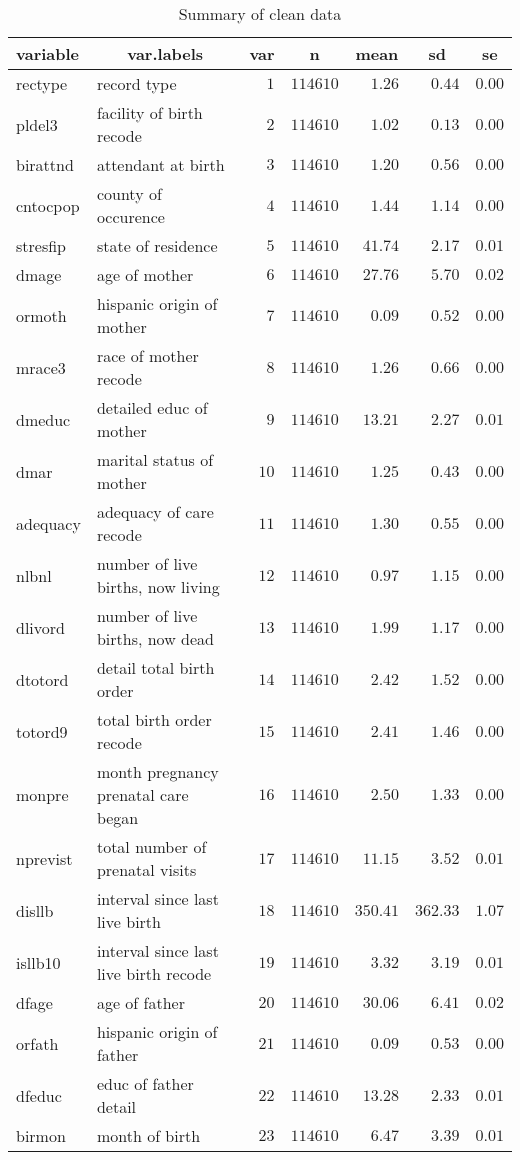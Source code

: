 %
\begin{table}[!tbp]
\footnotesize
\caption{Summary of clean data}
\label{tab:summaryClean} 
\begin{center}
\begin{tabular}{|l|l|r|r|r|r|r|}
\hline\hline
\multicolumn{1}{|l|}{variable}&\multicolumn{1}{c|}{var.labels}&\multicolumn{1}{c|}{var}&\multicolumn{1}{c|}{n}&\multicolumn{1}{c|}{mean}&\multicolumn{1}{c|}{sd}&\multicolumn{1}{c|}{se}\tabularnewline
\hline
rectype&record type&$ 1$&$114610$&$   1.26$&$  0.44$&$0.00$\tabularnewline
pldel3&facility of birth recode&$ 2$&$114610$&$   1.02$&$  0.13$&$0.00$\tabularnewline
birattnd&attendant at birth&$ 3$&$114610$&$   1.20$&$  0.56$&$0.00$\tabularnewline
cntocpop&county of occurence&$ 4$&$114610$&$   1.44$&$  1.14$&$0.00$\tabularnewline
stresfip&state of residence&$ 5$&$114610$&$  41.74$&$  2.17$&$0.01$\tabularnewline
dmage&age of mother&$ 6$&$114610$&$  27.76$&$  5.70$&$0.02$\tabularnewline
ormoth&hispanic origin of mother&$ 7$&$114610$&$   0.09$&$  0.52$&$0.00$\tabularnewline
mrace3&race of mother recode&$ 8$&$114610$&$   1.26$&$  0.66$&$0.00$\tabularnewline
dmeduc&detailed educ of mother&$ 9$&$114610$&$  13.21$&$  2.27$&$0.01$\tabularnewline
dmar&marital status of mother&$10$&$114610$&$   1.25$&$  0.43$&$0.00$\tabularnewline
adequacy&adequacy of care recode&$11$&$114610$&$   1.30$&$  0.55$&$0.00$\tabularnewline
nlbnl&number of live births, now living&$12$&$114610$&$   0.97$&$  1.15$&$0.00$\tabularnewline
dlivord&number of live births, now dead&$13$&$114610$&$   1.99$&$  1.17$&$0.00$\tabularnewline
dtotord&detail total birth order&$14$&$114610$&$   2.42$&$  1.52$&$0.00$\tabularnewline
totord9&total birth order recode&$15$&$114610$&$   2.41$&$  1.46$&$0.00$\tabularnewline
monpre&month pregnancy prenatal care began&$16$&$114610$&$   2.50$&$  1.33$&$0.00$\tabularnewline
nprevist&total number of prenatal visits&$17$&$114610$&$  11.15$&$  3.52$&$0.01$\tabularnewline
disllb&interval since last live birth&$18$&$114610$&$ 350.41$&$362.33$&$1.07$\tabularnewline
isllb10&interval since last live birth recode&$19$&$114610$&$   3.32$&$  3.19$&$0.01$\tabularnewline
dfage&age of father&$20$&$114610$&$  30.06$&$  6.41$&$0.02$\tabularnewline
orfath&hispanic origin of father&$21$&$114610$&$   0.09$&$  0.53$&$0.00$\tabularnewline
dfeduc&educ of father detail&$22$&$114610$&$  13.28$&$  2.33$&$0.01$\tabularnewline
birmon&month of birth&$23$&$114610$&$   6.47$&$  3.39$&$0.01$\tabularnewline

\end{tabular}
\end{center}
\end{table}

